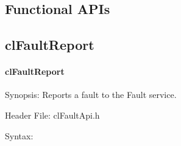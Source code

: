 \begin{flushleft}
\section{Functional APIs}

\subsection{clFaultReport}
\hypertarget{pagefm101}{}\paragraph{cl\-Fault\-Report}\label{pagefm101}
\begin{Desc}
\item[Synopsis:]Reports a fault to the Fault service.\end{Desc}
\begin{Desc}
\item[Header File:]clFaultApi.h\end{Desc}
\begin{Desc}
\item[Syntax:]


\end{Desc}
\end{flushleft}
